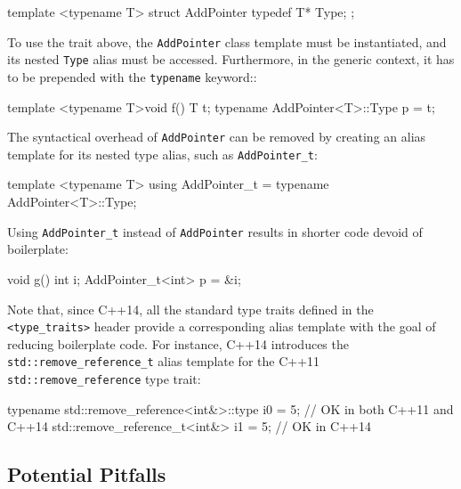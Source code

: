 \begin{emcppslisting}[language=C++]
template <typename T>
struct AddPointer
{
    typedef T* Type;
};
\end{emcppslisting}

\noindent To use the trait above, the \lstinline!AddPointer! class template must be instantiated, and its nested
\lstinline!Type! alias must be accessed. Furthermore, in the generic context, it has to be prepended with the \lstinline!typename! keyword::

\begin{emcppslisting}[language=C++]
template <typename T>void f()
{
    T t;
    typename AddPointer<T>::Type p = t;
}
\end{emcppslisting}

\noindent The syntactical overhead of \lstinline!AddPointer! can be removed by
creating an alias template for its nested type alias, such as
\lstinline!AddPointer_t!:

\begin{emcppslisting}[language=C++]
template <typename T>
using AddPointer_t = typename AddPointer<T>::Type;
\end{emcppslisting}

\noindent Using \lstinline!AddPointer_t! instead of \lstinline!AddPointer! results in
shorter code devoid of boilerplate:

\begin{emcppslisting}[language=C++]
void g()
{
    int i;
    AddPointer_t<int> p = &i;
}
\end{emcppslisting}

\noindent Note that, since C++14, all
the standard type traits defined in the \lstinline!<type_traits>! header
provide a corresponding alias template with the goal of reducing
boilerplate code. For instance, C++14 introduces the
\lstinline!std::remove_reference_t! alias template for the C++11
\lstinline!std::remove_reference! type trait:

\begin{emcppslisting}[language=C++]
typename std::remove_reference<int&>::type i0 = 5; // OK in both C++11 and C++14
std::remove_reference_t<int&> i1 = 5;              // OK in C++14
\end{emcppslisting}


\subsection[Potential Pitfalls]{Potential Pitfalls}\label{potential-pitfalls}

